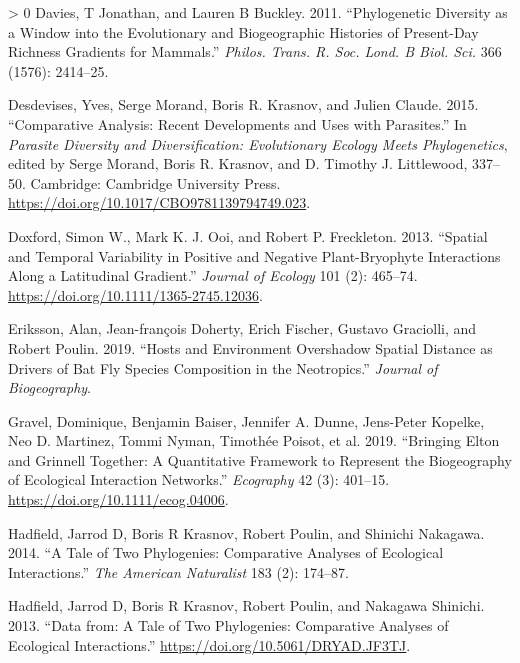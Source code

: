\documentclass[12pt]{article}
\newlength{\cslhangindent}
\newenvironment{CSLReferences}[3] %
 {%
  \setlength{\parindent}{0pt}
  \ifodd #1 \everypar{\setlength{\hangindent}{\cslhangindent}}\ignorespaces\fi
  \ifnum #2 > 0
  \setlength{\parskip}{#2\baselineskip}
  \fi
 }%
 {}
\begin{document}
\begin{CSLReferences}{1}{0}
\leavevmode\hypertarget{ref-Davies2011PhyDiv}{}%
Davies, T Jonathan, and Lauren B Buckley. 2011. {``Phylogenetic
Diversity as a Window into the Evolutionary and Biogeographic Histories
of Present-Day Richness Gradients for Mammals.''} \emph{Philos. Trans.
R. Soc. Lond. B Biol. Sci.} 366 (1576): 2414--25.

\leavevmode\hypertarget{ref-Desdevises2015ComAna}{}%
Desdevises, Yves, Serge Morand, Boris R. Krasnov, and Julien Claude.
2015. {``Comparative Analysis: Recent Developments and Uses with
Parasites.''} In \emph{Parasite Diversity and Diversification:
Evolutionary Ecology Meets Phylogenetics}, edited by Serge Morand, Boris
R. Krasnov, and D. Timothy J. Littlewood, 337--50. Cambridge: Cambridge
University Press. \url{https://doi.org/10.1017/CBO9781139794749.023}.

\leavevmode\hypertarget{ref-Doxford2013SpaTem}{}%
Doxford, Simon W., Mark K. J. Ooi, and Robert P. Freckleton. 2013.
{``Spatial and Temporal Variability in Positive and Negative
Plant-Bryophyte Interactions Along a Latitudinal Gradient.''}
\emph{Journal of Ecology} 101 (2): 465--74.
\url{https://doi.org/10.1111/1365-2745.12036}.

\leavevmode\hypertarget{ref-Eriksson2019HosEnv}{}%
Eriksson, Alan, Jean-françois Doherty, Erich Fischer, Gustavo Graciolli,
and Robert Poulin. 2019. {``Hosts and Environment Overshadow Spatial
Distance as Drivers of Bat Fly Species Composition in the Neotropics.''}
\emph{Journal of Biogeography}.

\leavevmode\hypertarget{ref-Gravel2019BriElt}{}%
Gravel, Dominique, Benjamin Baiser, Jennifer A. Dunne, Jens-Peter
Kopelke, Neo D. Martinez, Tommi Nyman, Timothée Poisot, et al. 2019.
{``Bringing Elton and Grinnell Together: A Quantitative Framework to
Represent the Biogeography of Ecological Interaction Networks.''}
\emph{Ecography} 42 (3): 401--15.
\url{https://doi.org/10.1111/ecog.04006}.

\leavevmode\hypertarget{ref-Hadfield2014-tw}{}%
Hadfield, Jarrod D, Boris R Krasnov, Robert Poulin, and Shinichi
Nakagawa. 2014. {``A Tale of Two Phylogenies: Comparative Analyses of
Ecological Interactions.''} \emph{The American Naturalist} 183 (2):
174--87.

\leavevmode\hypertarget{ref-Hadfield2013DatTal}{}%
Hadfield, Jarrod D, Boris R Krasnov, Robert Poulin, and Nakagawa
Shinichi. 2013. {``Data from: A Tale of Two Phylogenies: Comparative
Analyses of Ecological Interactions.''}
\url{https://doi.org/10.5061/DRYAD.JF3TJ}.


\end{CSLReferences}
\end{document}
